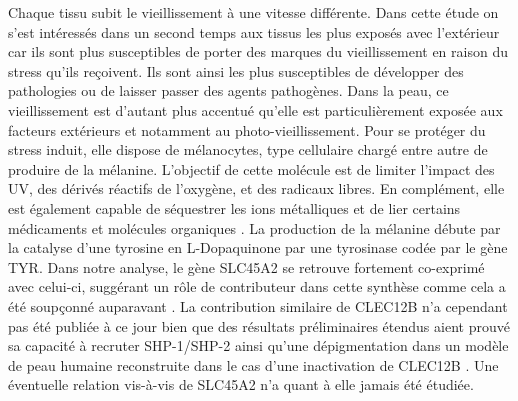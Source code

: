 Chaque tissu subit le vieillissement à une vitesse différente. 
Dans cette étude on s'est intéressés dans un second temps aux tissus les plus exposés avec l'extérieur car ils sont plus susceptibles de porter des marques du vieillissement en raison du stress qu'ils reçoivent. 
Ils sont ainsi les plus susceptibles de développer des pathologies ou de laisser passer des agents pathogènes.
Dans la peau, ce vieillissement est d'autant plus accentué qu'elle est particulièrement exposée aux facteurs extérieurs et notamment au photo-vieillissement. 
Pour se protéger du stress induit, elle dispose de mélanocytes, type cellulaire chargé entre autre de produire de la mélanine. 
L'objectif de cette molécule est de limiter l'impact des UV, des dérivés réactifs de l'oxygène, et des radicaux libres. En complément, elle est également capable de séquestrer les ions métalliques et de lier certains médicaments et molécules organiques \cite{Tolleson2005}. 
La production de la mélanine débute par la catalyse d'une tyrosine en L-Dopaquinone par une tyrosinase codée par le gène TYR. Dans notre analyse, le gène SLC45A2 se retrouve fortement co-exprimé avec celui-ci, suggérant un rôle de contributeur dans cette synthèse comme cela a été soupçonné auparavant \cite{Cullinane2011Oct, Ginger2008}. 
La contribution similaire de CLEC12B n'a cependant pas été publiée à ce jour bien que des résultats préliminaires étendus aient prouvé sa capacité à recruter SHP-1/SHP-2 ainsi qu'une dépigmentation dans un modèle de peau humaine reconstruite dans le cas d'une inactivation de CLEC12B \cite{Sormani2019}. Une éventuelle relation vis-à-vis de SLC45A2 n'a quant à elle jamais été étudiée. 

